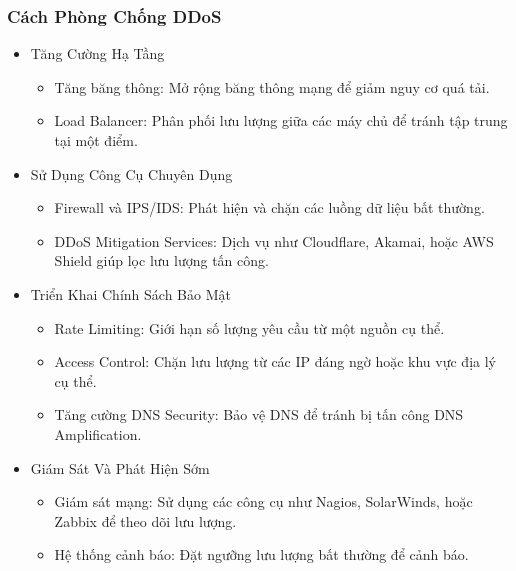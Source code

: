 \documentclass[13pt]{article}
\begin{document}
                \subsubsection{Cách Phòng Chống DDoS }
                \begin{itemize}
                \item Tăng Cường Hạ Tầng
                    \begin{itemize}
                        \item Tăng băng thông: Mở rộng băng thông mạng để giảm nguy cơ quá tải.
                        \item Load Balancer: Phân phối lưu lượng giữa các máy chủ để tránh tập trung tại một điểm.
                    \end{itemize}

                \item Sử Dụng Công Cụ Chuyên Dụng
                    \begin{itemize}
                        \item Firewall và IPS/IDS: Phát hiện và chặn các luồng dữ liệu bất thường.
                        \item DDoS Mitigation Services: Dịch vụ như Cloudflare, Akamai, hoặc AWS Shield giúp lọc lưu lượng tấn công.
                    \end{itemize}

                \item Triển Khai Chính Sách Bảo Mật
                    \begin{itemize}
                        \item Rate Limiting: Giới hạn số lượng yêu cầu từ một nguồn cụ thể.
                        \item Access Control: Chặn lưu lượng từ các IP đáng ngờ hoặc khu vực địa lý cụ thể.
                        \item Tăng cường DNS Security: Bảo vệ DNS để tránh bị tấn công DNS Amplification.
                    \end{itemize}

                \item Giám Sát Và Phát Hiện Sớm
                    \begin{itemize}
                        \item Giám sát mạng: Sử dụng các công cụ như Nagios, SolarWinds, hoặc Zabbix để theo dõi lưu lượng.
                        \item Hệ thống cảnh báo: Đặt ngưỡng lưu lượng bất thường để cảnh báo.
                    \end{itemize}
                
                \end{itemize}
\end{document}
